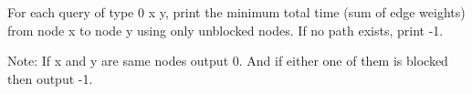 For each query of type 0 x y, print the minimum total time (sum of edge weights) from node
x to node y using only unblocked nodes. If no path exists, print -1.

Note: If x and y are same nodes output 0. And if either one of them is blocked then output -1.